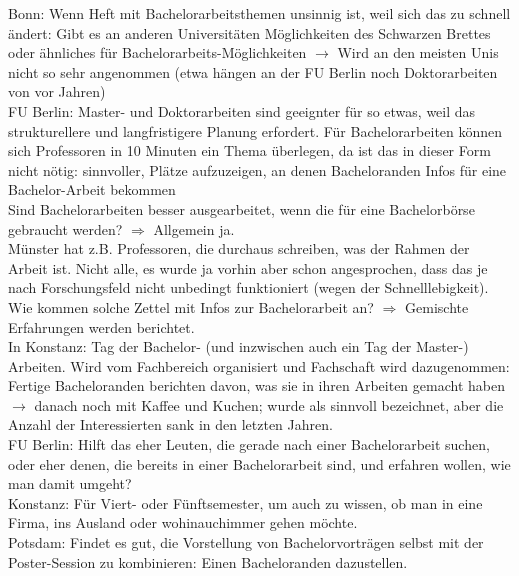     Bonn: Wenn Heft mit Bachelorarbeitsthemen unsinnig ist, weil sich das zu schnell ändert: Gibt es an anderen Universitäten Möglichkeiten des Schwarzen Brettes oder ähnliches für Bachelorarbeits-Möglichkeiten
    $\rightarrow$ Wird an den meisten Unis nicht so sehr angenommen (etwa hängen an der FU Berlin noch Doktorarbeiten von vor Jahren) \\

    FU Berlin: Master- und Doktorarbeiten sind geeignter für so etwas, weil das strukturellere und langfristigere Planung erfordert. Für Bachelorarbeiten können sich Professoren in 10 Minuten ein Thema überlegen, da ist das in dieser Form nicht nötig: sinnvoller, Plätze aufzuzeigen, an denen Bacheloranden Infos für eine Bachelor-Arbeit bekommen \\

    Sind Bachelorarbeiten besser ausgearbeitet, wenn die für eine Bachelorbörse gebraucht werden?
    $\Rightarrow$ Allgemein ja. \\
    Münster hat z.B. Professoren, die durchaus schreiben, was der Rahmen der Arbeit ist. Nicht alle, es wurde ja vorhin aber schon angesprochen, dass das je nach Forschungsfeld nicht unbedingt funktioniert (wegen der Schnelllebigkeit). \\

    Wie kommen solche Zettel mit Infos zur Bachelorarbeit an? $\Rightarrow$ Gemischte Erfahrungen werden berichtet. \\
    In Konstanz: Tag der Bachelor- (und inzwischen auch ein Tag der Master-) Arbeiten. Wird vom Fachbereich organisiert und Fachschaft wird dazugenommen: Fertige Bacheloranden berichten davon, was sie in ihren Arbeiten gemacht haben $\rightarrow$ danach noch mit Kaffee und Kuchen; wurde als sinnvoll bezeichnet, aber die Anzahl der Interessierten sank in den letzten Jahren. \\[16pt]

    FU Berlin: Hilft das eher Leuten, die gerade nach einer Bachelorarbeit suchen, oder eher denen, die bereits in einer Bachelorarbeit sind, und erfahren wollen, wie man damit umgeht?\\

    Konstanz: Für Viert- oder Fünftsemester, um auch zu wissen, ob man in eine Firma, ins Ausland oder wohinauchimmer gehen möchte.\\

    Potsdam: Findet es gut, die Vorstellung von Bachelorvorträgen selbst mit der Poster-Session zu kombinieren: Einen Bacheloranden dazustellen.\\

